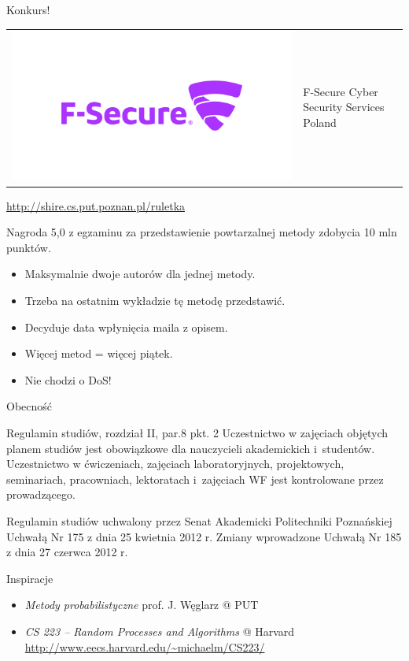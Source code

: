 \documentclass{mp}
\begin{document}
\begin{frame}{Konkurs!}
	\centering
	\begin{tabular}{m{}m{}}
		\includegraphics[width=.3\textwidth]{01_wstep/F-Secure_logo_package/Primary_Purple_RGB-01.jpg} &
		F-Secure Cyber Security Services Poland \\
	\end{tabular}
	\pause
	\centering
		\url{http://shire.cs.put.poznan.pl/ruletka} \\
	\pause
	\begin{block}{Nagroda}
		5,0 z egzaminu za przedstawienie powtarzalnej metody zdobycia 10 mln punktów.
		\begin{itemize}
			\item Maksymalnie dwoje autorów dla jednej metody.
			\item Trzeba na ostatnim wykładzie tę metodę przedstawić.
			\item Decyduje data wpłynięcia maila z opisem.
			\item Więcej metod = więcej piątek.
			\item \alert{Nie chodzi o DoS!}
		\end{itemize}
	\end{block}
\end{frame}
\begin{frame}{Obecność}
\begin{block}{Regulamin studiów, rozdział II, par.8 pkt. 2}
Uczestnictwo w zajęciach objętych planem studiów jest obowiązkowe dla nauczycieli akademickich i~studentów.
Uczestnictwo w ćwiczeniach, zajęciach laboratoryjnych, projektowych, seminariach, pracowniach, lektoratach i~zajęciach WF jest kontrolowane przez prowadzącego.
\end{block}
{\tiny Regulamin studiów uchwalony przez Senat Akademicki Politechniki Poznańskiej Uchwałą Nr 175 z dnia 25 kwietnia 2012 r. Zmiany wprowadzone Uchwałą Nr 185 z dnia 27 czerwca 2012 r.}
\end{frame}
\begin{frame}{Inspiracje}
\begin{itemize}
\item \emph{Metody probabilistyczne} prof. J. Węglarz @ PUT
\item \emph{CS 223 -- Random Processes and Algorithms} @ Harvard \\
\url{http://www.eecs.harvard.edu/~michaelm/CS223/}
\end{itemize}
\end{frame}
\end{document}
